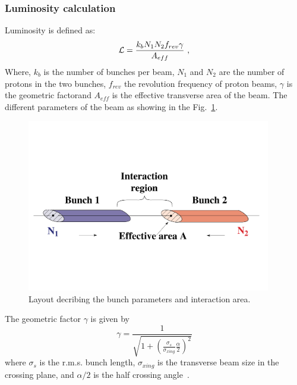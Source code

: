 \subsubsection{Luminosity calculation} %
\label{ssub:luminosity_calculation}
Luminosity is defined as:
\begin{equation}
    \mathcal{L} = \frac{k_bN_1N_2f_{rev}\gamma}{A_{eff}}~,
\end{equation}
Where, $k_b$ is the number of bunches per beam, $N_1$ and $N_2$ are the number of protons in the two bunches, $f_{rev}$ the revolution frequency of proton beams, {\color{red}$\gamma$ is the geometric factor}and $A_{eff}$ is the effective transverse area of the beam. The different parameters of the beam as showing in the Fig.~\ref{fig:lumi}.
\begin{figure}[!htbp]
	\centering
	\includegraphics[width=0.95\textwidth]{figures/LHC/Luminosity_calculation.pdf}
	\caption{Layout decribing the bunch parameters and interaction area.}
	\label{fig:lumi}
\end{figure}
{\color{red}The geometric factor $\gamma$ is given by
\begin{equation}
	\gamma = \frac{1}{\sqrt{1+(\frac{\sigma_s}{\sigma_{xing}}\frac{\alpha}{2})^2}}
\end{equation}
where $\sigma_s$ is the r.m.s. bunch length, $\sigma_{xing}$ is the transverse beam size in the crossing plane, and $\alpha/2$ is the half crossing angle~\cite{Hostettler2017}.}
